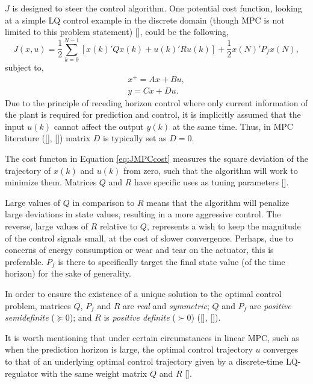 $J$ is designed to steer the control algorithm. One potential cost function, looking at a simple \gls{LQ} control example in the discrete domain (though \gls{MPC} is not limited to this problem statement) [\citeauthor{Rawlings2012}], could be the following,
\begin{equation}
J(x, u)=\frac{1}{2} \sum_{k=0}^{N-1}\left[x(k)'Qx(k) + u(k)'Ru(k)\right] + \frac{1}{2}x(N)'P_fx(N),
\label{eq:JMPCcost}
\end{equation}
subject to,
\begin{align}
x^+ = Ax + Bu, \\
y = Cx + Du.
\label{eq:discTimeLinearModel}
\end{align}
Due to the principle of receding horizon control where only current information of the plant is required for prediction and control, it is implicitly assumed that the input $u(k)$ cannot affect the output $y(k)$ at the same time. Thus, in MPC literature ([\citeauthor{Hoy2012}], [\citeauthor{Wang2009a}]) matrix $D$ is typically set as $D=0$. 

The cost functon in Equation \ref{eq:JMPCcost} measures the square deviation of the trajectory of $x(k)$ and $u(k)$ from zero, such that the algorithm will work to minimize them. Matrices $Q$ and $R$ have specific uses as tuning parameters [\citeauthor{Rawlings2012}]. 

Large values of $Q$ in comparison to $R$ means that the algorithm will penalize large deviations in state values, resulting in a more aggressive control. The reverse, large values of $R$ relative to $Q$, represents a wish to keep the magnitude of the control signals small, at the cost of slower convergence. Perhaps, due to concerns of energy consumption or wear and tear on the actuator, this is preferable. $P_f$ is there to specifically target the final state value (of the time horizon) for the sake of generality. 

In order to ensure the existence of a unique solution to the optimal control problem, matrices $Q$, $P_f$ and $R$ are \textit{real} and \textit{symmetric}; $Q$ and $P_f$ are \textit{positive semidefinite} ($\succeq 0$); and $R$ is \textit{positive definite} ($\succ 0$) ([\citeauthor{Rawlings2012}], [\citeauthor{Richter2012}]).

It is worth mentioning that under certain circumstances in linear \gls{MPC}, such as when the prediction horizon is large, the optimal control trajectory $u$ converges to that of an underlying optimal control trajectory given by a discrete-time \gls{LQ}-regulator with the same weight matrix $Q$ and $R$ [\citeauthor{Wang2009a}].

